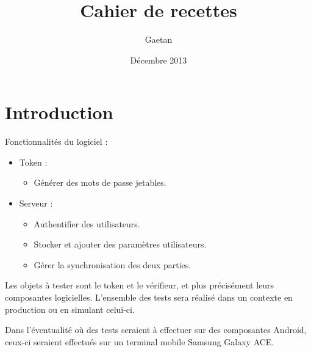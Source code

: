 \documentclass{"../../res/univ-projet"}
\title{Cahier de recettes}
\author{\bsc{Ferry} Gaetan}
\date{Décembre 2013}
\begin{document}
  \maketitle
  \section{Introduction}
  Fonctionnalités du logiciel :
  \begin{itemize}
    \item Token : 
    \begin{itemize}
      \item Générer des mots de passe jetables.
    \end{itemize}

    \item Serveur :
    \begin{itemize}
      \item Authentifier des utilisateurs.
      \item Stocker et ajouter des paramètres utilisateurs.
      \item Gérer la synchronisation des deux parties.
    \end{itemize}
  \end{itemize}

  Les objets à tester sont le token et le vérifieur, et plus précisément leurs composantes logicielles. L'ensemble des tests sera réalisé dans un contexte \og{}en 
  production\fg{} ou en simulant celui-ci.
  
  Dans l'éventualité o\`u des tests seraient à effectuer sur des composantes Android, ceux-ci seraient effectués sur un terminal mobile Samsung Galaxy ACE.
  
\end{document}

